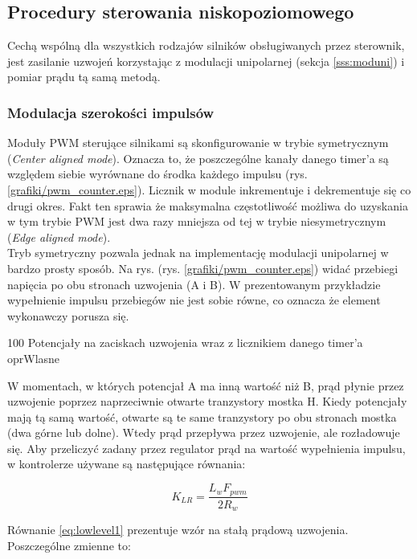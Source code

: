 \subsection{Procedury sterowania niskopoziomowego}
\label{sss:lowlevel}

Cechą wspólną dla wszystkich rodzajów silników obsługiwanych przez sterownik, jest zasilanie uzwojeń korzystając z  modulacji unipolarnej (sekcja \ref{sss:moduni}) i pomiar prądu tą samą metodą. 

\subsubsection{Modulacja szerokości impulsów}
\label{sss:pwm_soft}

Moduły PWM sterujące silnikami są skonfigurowanie w trybie symetrycznym ({\it Center aligned mode}). Oznacza to, że poszczególne kanały danego timer'a są względem siebie wyrównane do środka każdego impulsu (rys. \ref{grafiki/pwm_counter.eps}). Licznik w module inkrementuje i dekrementuje się co drugi okres. Fakt ten sprawia że maksymalna częstotliwość możliwa do uzyskania w tym trybie PWM jest dwa razy mniejsza od tej w trybie niesymetrycznym ({\it Edge aligned mode}). \\
	
Tryb symetryczny pozwala jednak na implementację modulacji unipolarnej w bardzo prosty sposób. Na rys. (rys. \ref{grafiki/pwm_counter.eps}) widać przebiegi napięcia po obu stronach uzwojenia (A i B). W prezentowanym przykładzie wypełnienie impulsu przebiegów nie jest sobie równe, co oznacza że element wykonawczy porusza się. 

	{100}
	{Potencjały na zaciskach uzwojenia wraz z licznikiem danego timer'a}
	{oprWlasne}

W momentach, w których potencjał A ma inną wartość niż B, prąd płynie przez uzwojenie poprzez naprzeciwnie otwarte tranzystory mostka H. Kiedy potencjały mają tą samą wartość, otwarte są te same tranzystory po obu stronach mostka (dwa górne lub dolne). Wtedy prąd przepływa przez uzwojenie, ale rozładowuje się. Aby przeliczyć zadany przez regulator prąd na wartość wypełnienia impulsu, w kontrolerze używane są następujące równania: 

\begin{equation} \label{eq:lowlevel1}
	K_{LR} = \frac{L_w F_{pwm}}{2 R_w}
\end{equation}

Równanie \ref{eq:lowlevel1} prezentuje wzór na stałą prądową uzwojenia. Poszczególne zmienne to:

